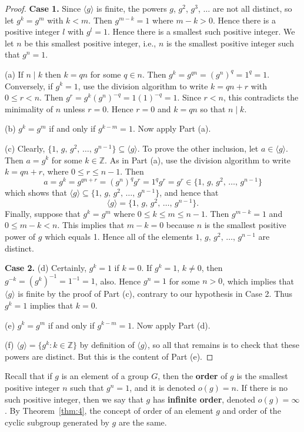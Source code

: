 \documentclass[11pt]{article}
\newcommand{\Z} {{\mathbb Z}}
\newcommand{\divides}{\ensuremath{\mid}}
\theoremstyle{plain}
\theoremstyle{definition}
\begin{document}
\begin{proof}  {\bf Case 1.} Since $\langle g\rangle $ is finite, the powers
$g$, $g^2$, $g^3$, $\ldots$ are not all distinct, so let $g^k=g^m$
with $k<m$.  Then $g^{m-k} =1$ where $m-k>0$.  Hence there is a
positive integer $l$ with $g^l=1$.  Hence there is a smallest such
positive integer.  We let $n$ be this smallest positive integer,
i.e., $n$ is the smallest positive integer such that $g^n=1$.

(a)  If $n\divides k$ then $k=qn$ for some $q\in n$.  Then
$g^k=g^{qn}=(g^n)^q=1^q=1$.   Conversely, if $g^k=1$, use the
division algorithm to write $k=qn+r$ with $0\le r<n$.  Then
$g^r=g^k(g^n)^{-q} = 1(1)^{-q} =1$.  Since $r<n$, this contradicts
the minimality of $n$ unless $r=0$.  Hence $r=0$ and $k=qn$ so
that $n\divides k$.

(b)  $g^k=g^m$ if and only if $g^{k-m} = 1$.  Now apply Part (a).

(c)  Clearly, $\{1,\, g,\, g^2,\, \ldots,\, g^{n-1}\} \subseteq
\langle g\rangle$.   To prove the other inclusion, let $a\in
\langle g\rangle$.  Then $a=g^k$ for some $k\in \Z$.  As in Part
(a), use the division algorithm to write $k=qn+r$, where $0\le
r\le n-1$.  Then
$$a=g^k=g^{qn+r}=(g^n)^qg^r=1^qg^r=g^r\in \{1,\, g,\, g^2,\, \ldots,\, g^{n-1}\}$$
which shows  that $\langle g\rangle \subseteq \{1,\, g,\, g^2,\,
\ldots,\, g^{n-1}\}$, and hence that
$$\langle g\rangle = \{1,\, g,\, g^2,\, \ldots,\, g^{n-1}\}.$$
Finally, suppose that $g^k=g^m$ where $0\le k\le m\le n-1$.   Then
$g^{m-k} =1$ and $0\le m-k <n$.  This implies that $m-k=0$ because
$n$ is the smallest positive power of $g$ which equals 1.  Hence
all of the elements $1,\, g,\, g^2,\, \ldots,\, g^{n-1}$ are
distinct.

{\bf Case 2.}  (d)  Certainly,  $g^k=1$ if $k=0$.  If $g^k=1$,
$k\ne 0$, then $g^{-k} = (g^k)^{-1} = 1^{-1} = 1$, also.  Hence
$g^n=1$ for some $n>0$, which implies that $\langle g\rangle$ is
finite by the proof of Part (c), contrary to our hypothesis in
Case 2.  Thus $g^k=1$ implies that $k=0$.

(e)  $g^k=g^m$ if and only if $g^{k-m} =1$.  Now apply Part (d).

(f)  $\langle g\rangle =\{g^k: k\in \Z\}$  by definition of
$\langle g\rangle$, so all that remains is to check that these
powers are distinct.  But this is the content of Part (e).
\end{proof}

Recall that if $g$ is an element of a  group $G$, then the {\bf
order} of $g$ is the smallest positive integer $n$ such that
$g^n=1$, and it is denoted $o(g)=n$.  If there is no such positive
integer, then we say that $g$ has {\bf infinite order}, denoted
$o(g)=\infty$.  By Theorem~\ref{thm:4}, the concept of order of an element
$g$ and order of the cyclic subgroup generated by $g$ are the
same.
\end{document}
